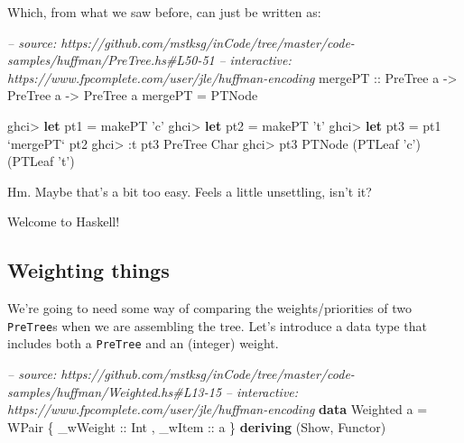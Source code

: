 \documentclass[]{article}
\newenvironment{Shaded}{}{}
\newcommand{\KeywordTok}[1]{\textcolor[rgb]{0.00,0.44,0.13}{\textbf{{#1}}}}
\newcommand{\DataTypeTok}[1]{\textcolor[rgb]{0.56,0.13,0.00}{{#1}}}
\newcommand{\CharTok}[1]{\textcolor[rgb]{0.25,0.44,0.63}{{#1}}}
\newcommand{\CommentTok}[1]{\textcolor[rgb]{0.38,0.63,0.69}{\textit{{#1}}}}
\newcommand{\OtherTok}[1]{\textcolor[rgb]{0.00,0.44,0.13}{{#1}}}
\newcommand{\FunctionTok}[1]{\textcolor[rgb]{0.02,0.16,0.49}{{#1}}}
\newcommand{\NormalTok}[1]{{#1}}
\begin{document}
Which, from what we saw before, can just be written as:

\begin{Shaded}
\begin{Highlighting}[]
\CommentTok{-- source: https://github.com/mstksg/inCode/tree/master/code-samples/huffman/PreTree.hs#L50-51}
\CommentTok{-- interactive: https://www.fpcomplete.com/user/jle/huffman-encoding}
\OtherTok{mergePT ::} \DataTypeTok{PreTree} \NormalTok{a }\OtherTok{->} \DataTypeTok{PreTree} \NormalTok{a }\OtherTok{->} \DataTypeTok{PreTree} \NormalTok{a}
\NormalTok{mergePT }\FunctionTok{=} \DataTypeTok{PTNode}
\end{Highlighting}
\end{Shaded}

\begin{Shaded}
\begin{Highlighting}[]
\NormalTok{ghci}\FunctionTok{>} \KeywordTok{let} \NormalTok{pt1 }\FunctionTok{=} \NormalTok{makePT }\CharTok{'c'}
\NormalTok{ghci}\FunctionTok{>} \KeywordTok{let} \NormalTok{pt2 }\FunctionTok{=} \NormalTok{makePT }\CharTok{'t'}
\NormalTok{ghci}\FunctionTok{>} \KeywordTok{let} \NormalTok{pt3 }\FunctionTok{=} \NormalTok{pt1 }\OtherTok{`mergePT`} \NormalTok{pt2}
\NormalTok{ghci}\FunctionTok{>} \FunctionTok{:}\NormalTok{t pt3}
\DataTypeTok{PreTree} \DataTypeTok{Char}
\NormalTok{ghci}\FunctionTok{>} \NormalTok{pt3}
\DataTypeTok{PTNode} \NormalTok{(}\DataTypeTok{PTLeaf} \CharTok{'c'}\NormalTok{) (}\DataTypeTok{PTLeaf} \CharTok{'t'}\NormalTok{)}
\end{Highlighting}
\end{Shaded}

Hm. Maybe that's a bit too easy. Feels a little unsettling, isn't it?

Welcome to Haskell!

\subsection{Weighting things}\label{weighting-things}

We're going to need some way of comparing the weights/priorities of two
\texttt{PreTree}s when we are assembling the tree. Let's introduce a
data type that includes both a \texttt{PreTree} and an (integer) weight.

\begin{Shaded}
\begin{Highlighting}[]
\CommentTok{-- source: https://github.com/mstksg/inCode/tree/master/code-samples/huffman/Weighted.hs#L13-15}
\CommentTok{-- interactive: https://www.fpcomplete.com/user/jle/huffman-encoding}
\KeywordTok{data} \DataTypeTok{Weighted} \NormalTok{a }\FunctionTok{=} \DataTypeTok{WPair} \NormalTok{\{ _}\OtherTok{wWeight ::} \DataTypeTok{Int}
                        \NormalTok{, _}\OtherTok{wItem   ::} \NormalTok{a}
                        \NormalTok{\} }\KeywordTok{deriving} \NormalTok{(}\DataTypeTok{Show}\NormalTok{, }\DataTypeTok{Functor}\NormalTok{)}
\end{Highlighting}
\end{Shaded}
\end{document}
